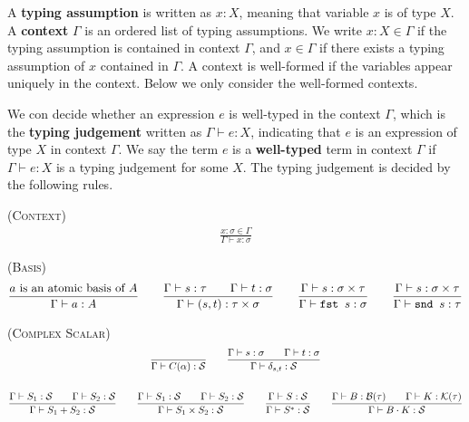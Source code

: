 \begin{definition}[context]
  A \textbf{typing assumption} is written as $x : X$, meaning that variable $x$ is of type $X$. A \textbf{context} $\Gamma$ is an ordered list of typing assumptions. We write $x : X \in \Gamma$ if the typing assumption is contained in context $\Gamma$, and $x \in \Gamma$ if there exists a typing assumption of $x$ contained in $\Gamma$. A context is well-formed if the variables appear uniquely in the context. Below we only consider the well-formed contexts.
\end{definition}

We con decide whether an expression $e$ is well-typed in the context $\Gamma$, which is the \textbf{typing judgement} written as $\Gamma \vdash e : X$, indicating that $e$ is an expression of type $X$ in context $\Gamma$.
We say the term $e$ is a \textbf{well-typed} term in context $\Gamma$ if $\Gamma \vdash e : X$ is a typing judgement for some $X$. The typing judgement is decided by the following rules.

\textsc{(Context)}
\begin{gather*}
  \frac{x : \sigma \in \Gamma}{\Gamma \vdash x : \sigma}
\end{gather*}

\textsc{(Basis)}
\begin{gather*}
  \frac{a \text{ is an atomic basis of } A}{\Gamma \vdash a : A}
  \qquad
  \frac{\Gamma \vdash s : \tau \qquad \Gamma \vdash t : \sigma}{\Gamma \vdash (s, t) :  \tau \times \sigma }
  \qquad
  \frac{\Gamma \vdash s : \sigma \times \tau }{\Gamma \vdash \texttt{fst } s : \sigma}
  \qquad
  \frac{\Gamma \vdash s : \sigma \times \tau }{\Gamma \vdash \texttt{snd } s : \tau}
\end{gather*}

\textsc{(Complex Scalar)}
\begin{gather*}
  \frac{}{\Gamma \vdash C(\alpha) : \mathcal{S}}
  \qquad
  \frac{\Gamma \vdash s : \sigma \qquad \Gamma \vdash t : \sigma}{\Gamma \vdash \delta_{s, t} : \mathcal{S}} \\
  \\
  \frac{\Gamma \vdash S_1 : \mathcal{S} \qquad \Gamma \vdash S_2 : \mathcal{S} }{\Gamma \vdash S_1 + S_2 : \mathcal{S} }
  \qquad
  \frac{\Gamma \vdash S_1 : \mathcal{S} \qquad \Gamma \vdash S_2 : \mathcal{S}}{\Gamma \vdash S_1 \times S_2 : \mathcal{S}}
  \qquad
  \frac{\Gamma \vdash S : \mathcal{S}}{\Gamma \vdash S^* : \mathcal{S}}
  \qquad
  \frac{\Gamma \vdash B: \mathcal{B}(\tau) \qquad \Gamma \vdash K : \mathcal{K}(\tau) }{\Gamma \vdash B \cdot K : \mathcal{S} }
\end{gather*}

